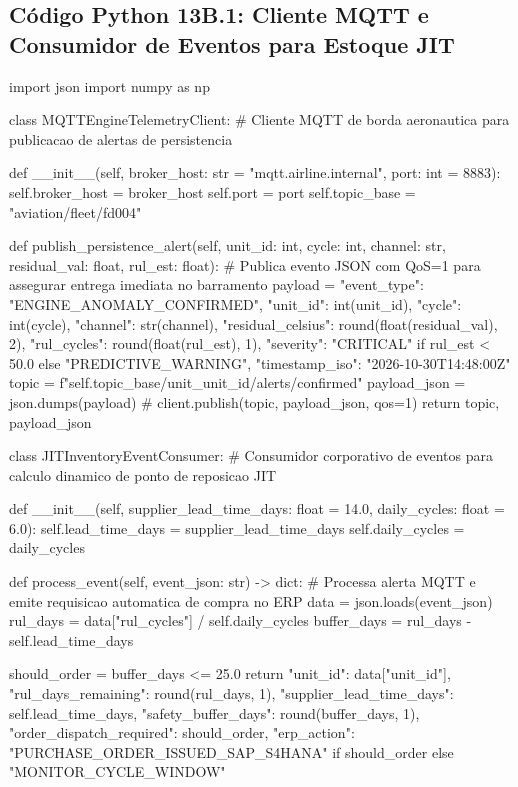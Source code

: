 \subsection{Código Python 13B.1: Cliente MQTT e Consumidor de Eventos para Estoque JIT}
\begin{codebox}
import json
import numpy as np

class MQTTEngineTelemetryClient:
    # Cliente MQTT de borda aeronautica para publicacao de alertas de persistencia

    def __init__(self, broker_host: str = "mqtt.airline.internal", port: int = 8883):
        self.broker_host = broker_host
        self.port = port
        self.topic_base = "aviation/fleet/fd004"

    def publish_persistence_alert(self, unit_id: int, cycle: int, channel: str, residual_val: float, rul_est: float):
        # Publica evento JSON com QoS=1 para assegurar entrega imediata no barramento
        payload = {
            "event_type": "ENGINE_ANOMALY_CONFIRMED",
            "unit_id": int(unit_id),
            "cycle": int(cycle),
            "channel": str(channel),
            "residual_celsius": round(float(residual_val), 2),
            "rul_cycles": round(float(rul_est), 1),
            "severity": "CRITICAL" if rul_est < 50.0 else "PREDICTIVE_WARNING",
            "timestamp_iso": "2026-10-30T14:48:00Z"
        }
        topic = f"{self.topic_base}/unit_{unit_id}/alerts/confirmed"
        payload_json = json.dumps(payload)
        # client.publish(topic, payload_json, qos=1)
        return topic, payload_json


class JITInventoryEventConsumer:
    # Consumidor corporativo de eventos para calculo dinamico de ponto de reposicao JIT

    def __init__(self, supplier_lead_time_days: float = 14.0, daily_cycles: float = 6.0):
        self.lead_time_days = supplier_lead_time_days
        self.daily_cycles = daily_cycles

    def process_event(self, event_json: str) -> dict:
        # Processa alerta MQTT e emite requisicao automatica de compra no ERP
        data = json.loads(event_json)
        rul_days = data["rul_cycles"] / self.daily_cycles
        buffer_days = rul_days - self.lead_time_days
        
        should_order = buffer_days <= 25.0
        return {
            "unit_id": data["unit_id"],
            "rul_days_remaining": round(rul_days, 1),
            "supplier_lead_time_days": self.lead_time_days,
            "safety_buffer_days": round(buffer_days, 1),
            "order_dispatch_required": should_order,
            "erp_action": "PURCHASE_ORDER_ISSUED_SAP_S4HANA" if should_order else "MONITOR_CYCLE_WINDOW"
        }
\end{codebox}

\bigskip
